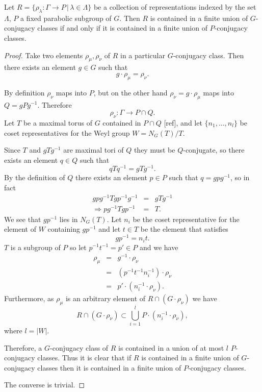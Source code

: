 \begin{lemma}\label{GIsPConj} Let $R=\{\rho_\lambda:\Gamma\rightarrow P\, |\, \lambda \in \Lambda\}$ be a collection of representations indexed by the set $\Lambda$, $P$ a fixed parabolic subgroup of $G$. Then $R$ is contained in a finite union of $G$-conjugacy classes if and only if it is contained in a finite union of $P$-conjugacy classes.
\end{lemma}
\begin{proof}
	Take two elements $\rho_\mu, \rho_\nu$ of $R$ in a particular $G$-conjugacy class. Then there exists an element $g\in G$ such that
	\begin{displaymath}
		g\cdot \rho_\mu = \rho_\nu.
	\end{displaymath}
	
	By definition $\rho_\nu$ maps into $P$, but on the other hand $\rho_\nu = g\cdot \rho_\mu$ maps into $Q = gPg^{-1}$. Therefore 
	\begin{displaymath}
		\rho_\nu: \Gamma\rightarrow P \cap Q.
	\end{displaymath}
	Let $T$ be a maximal torus of $G$ contained in $P\cap Q$ [ref], and let $\{n_1, \ldots, n_l\}$ be coset representatives for the Weyl group $W = N_G(T)/T$.
	
	Since $T$ and $gTg^{-1}$ are maximal tori of $Q$ they must be $Q$-conjugate, so there exists an element $q\in Q$ such that
	\begin{displaymath}
		qTq^{-1} = gTg^{-1}.
	\end{displaymath}
	By the definition of $Q$ there exists an element $p\in P$ such that $q = gpg^{-1}$, so in fact
	\begin{eqnarray*}
		gpg^{-1}Tgp^{-1}g^{-1} &=& gTg^{-1} \\
		\Rightarrow pg^{-1}Tgp^{-1} &=& T.
	\end{eqnarray*}
	We see that $gp^{-1}$ lies in $N_G(T)$. Let $n_i$ be the coset representative for the element of $W$ containing $gp^{-1}$ and let $t\in T$ be the element that satisfies
	\begin{displaymath}
		gp^{-1} = n_it.
	\end{displaymath}
	$T$ is a subgroup of $P$ so let $p^{-1}t^{-1} = p' \in P$ and we have
	\begin{eqnarray*}
		\rho_\mu &=& g^{-1}\cdot\rho_\nu\\
		&=& (p^{-1}t^{-1}n_i^{-1})\cdot\rho_\nu\\
		&=& p'\cdot(n_i^{-1}\cdot\rho_\nu). 
	\end{eqnarray*}
	Furthermore, as $\rho_\mu$ is an arbitrary element of $R\cap \left(G\cdot \rho_\nu\right)$ we have
	\begin{displaymath}
		R \cap \left(G\cdot \rho_\nu\right) \subset \bigcup_{i=1}^l P\cdot(n_i^{-1}\cdot\rho_\nu),
	\end{displaymath}
	where $l = |W|$.
	
	Therefore, a $G$-conjugacy class of $R$ is contained in a union of at most $l$ $P$-conjugacy classes. Thus it is clear that if $R$ is contained in a finite union of $G$-conjugacy classes then it is contained in a finite union of $P$-conjugacy classes.
	
	The converse is trivial.
\end{proof}

